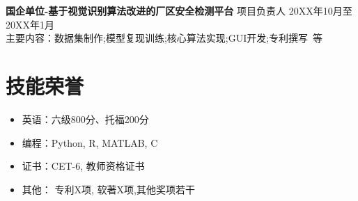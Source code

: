     \vspace{0.5em}
    {\large{\textbf{国企单位-基于视觉识别算法改进的厂区安全检测平台}}} 项目负责人 \hfill {20XX年10月至20XX年1月}\\
    主要内容：数据集制作;模型复现训练;核心算法实现;GUI开发;专利撰写\ 等

    \section{\makebox[\widthof{\faWrench}][c]{\color{SWU_Blue}{\faWrench}}\quad 技能荣誉 }
    \vspace{0.5em}
    \begin{itemize}
        \item 英语：六级800分、托福200分
        \item 编程：Python, R, MATLAB, C
        \item 证书：CET-6, 教师资格证书
        \item 其他： 专利X项, 软著X项,其他奖项若干
    \end{itemize}
    


    
    
